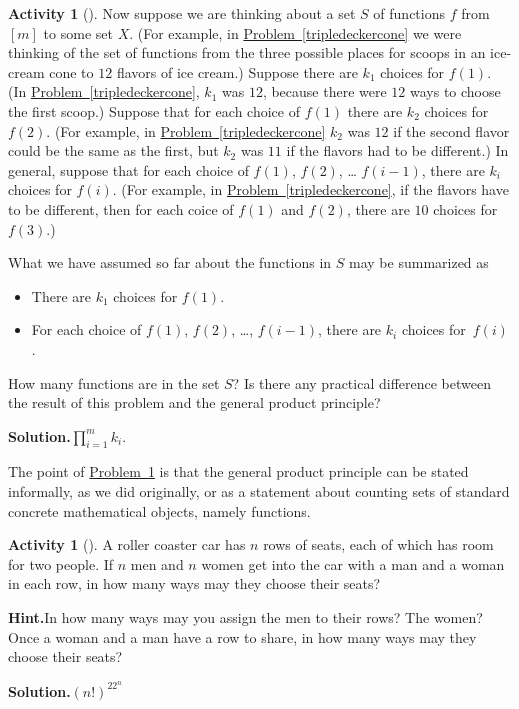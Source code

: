 \documentclass[10pt,]{book}
\theoremstyle{plain}
\theoremstyle{definition}
\newtheorem{activity}[project]{Activity}
\numberwithin{equation}{chapter}
\begin{document}
\begin{activity}[]\label{generalproductprinciple}
Now suppose we are thinking about a set \(S\) of functions \(f\) from \([m]\) to some set \(X\). (For example, in \hyperref[tripledeckercone]{Problem~\ref{tripledeckercone}} we were thinking of the set of functions from the three possible places for scoops in an ice-cream cone to \(12\) flavors of ice cream.) Suppose there are \(k_1\) choices for \(f(1)\). (In \hyperref[tripledeckercone]{Problem~\ref{tripledeckercone}}, \(k_1\) was \(12\), because there were \(12\) ways to choose the first scoop.) Suppose that for each choice of \(f(1)\) there are \(k_2\) choices for \(f(2)\). (For example, in \hyperref[tripledeckercone]{Problem~\ref{tripledeckercone}} \(k_2\) was \(12\) if the second flavor could be the same as the first, but \(k_2\) was \(11\) if the flavors had to be different.) In general, suppose that for each choice of \(f(1)\), \(f(2)\), \dots{} \(f(i-1)\), there are \(k_i\) choices for \(f(i)\). (For example, in \hyperref[tripledeckercone]{Problem~\ref{tripledeckercone}}, if the flavors have to be different, then for each coice of \(f(1)\) and \(f(2)\), there are \(10\) choices for \(f(3)\).)%
\par
What we have assumed so far about the functions in \(S\) may be summarized as \leavevmode%
\begin{itemize}[label=\textbullet]
\item{}There are \(k_1\) choices for \(f(1)\).%
\item{}For each choice of \(f(1)\), \(f(2)\), \dots{}, \(f(i-1)\), there are \(k_i\) choices for~\(f(i)\).%
\end{itemize}
%
How many functions are in the set \(S\)? Is there any practical difference between the result of this problem and the general product principle?%
\par\medskip\noindent%
\textbf{Solution.}\quad \(\prod_{i=1}^m k_i\).%
\end{activity}
The point of \hyperref[generalproductprinciple]{Problem~\ref{generalproductprinciple}} is that the general product principle can be stated informally, as we did originally, or as a statement about counting sets of standard concrete mathematical objects, namely functions.%
\begin{activity}[]\label{activity-15}
A roller coaster car has \(n\) rows of seats, each of which has room for two people. If \(n\) men and \(n\) women get into the car with a man and a woman in each row, in how many ways may they choose their seats?%
\par\medskip\noindent%
\textbf{Hint.}\quad In how many ways may you assign the men to their rows? The women? Once a woman and a man have a row to share, in how many ways may they choose their seats?%
\par\medskip\noindent%
\textbf{Solution.}\quad \((n!)^22^n\)%
\end{activity}
\end{document}
